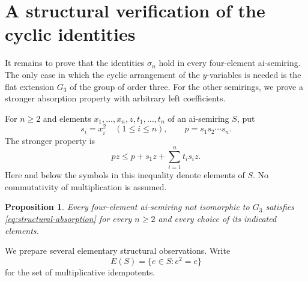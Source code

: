 \documentclass[11pt,reqno]{amsart}
\newtheorem{proposition}[theorem]{Proposition}
\theoremstyle{remark}
\numberwithin{equation}{section}
\begin{document}
\section{A structural verification of the cyclic identities}
\label{sec:application}

It remains to prove that the identities $\sigma_n$ hold in every
four-element ai-semiring. The only case in which the cyclic arrangement
of the $y$-variables is needed is the flat extension $G_3$ of the group
of order three. For the other semirings, we prove a stronger absorption
property with arbitrary left coefficients.

For $n\geq2$ and elements $x_1,\ldots,x_n,z,t_1,\ldots,t_n$ of an
ai-semiring $S$, put
\[
s_i=x_i^2\quad(1\leq i\leq n),\qquad p=s_1s_2\cdots s_n.
\]
The stronger property is
\begin{equation}\label{eq:structural-absorption}
pz\leq p+s_1z+\sum_{i=1}^{n}t_i s_i z.
\end{equation}
Here and below the symbols in this inequality denote elements of $S$.
No commutativity of multiplication is assumed.

\begin{proposition}\label{prop:strong-absorption}
Every four-element ai-semiring not isomorphic to $G_3$ satisfies
\eqref{eq:structural-absorption} for every $n\geq2$ and every choice of
its indicated elements.
\end{proposition}

We prepare several elementary structural observations. Write
\[
E(S)=\{e\in S:e^2=e\}
\]
for the set of multiplicative idempotents.
\end{document}
